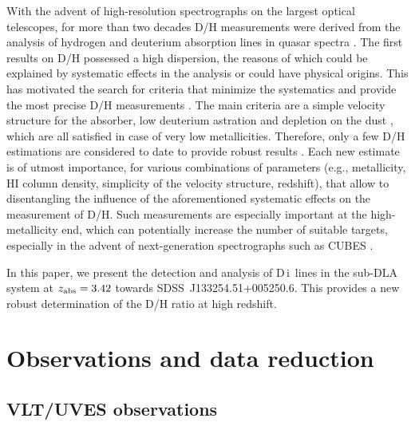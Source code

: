 \documentclass[fleqn,usenatbib]{mnras}
\newcommand{\SB}[1]{{\color{OrangeRed} SB:~ #1}}
\newcommand{\DI}[0]{D\,{\sc i}}
\newcommand{\ql}{SDSS~J133254.51+005250.6}
\begin{document}
With the advent of high-resolution spectrographs on the largest optical telescopes, for more than two decades D/H measurements were derived from the analysis of hydrogen and deuterium absorption lines in quasar spectra \citep{Tytler_1996, Noterdaeme_2012, Cooke_2014, Cooke_2018}. The first results on D/H possessed a high dispersion, the reasons of which could be explained by systematic effects in the analysis or could have physical origins. This has motivated the search for criteria that minimize the systematics and provide the most precise D/H measurements \citep{Cooke_2014}. The main criteria are a simple velocity structure for the absorber, low deuterium astration and depletion on the dust \citep{Cooke_2018}, which are all satisfied in case of very low metallicities. Therefore, only a few D/H estimations are considered to date to provide robust results \citep{Cooke_2018}. %
Each new estimate is of utmost importance, for various combinations of parameters (e.g., metallicity, HI column density, simplicity of the velocity structure, redshift), that allow to disentangling the influence of the aforementioned systematic effects on the measurement of D/H. Such measurements are especially important at the high-metallicity end, which can potentially increase the number of suitable targets, especially in the advent of next-generation spectrographs such as CUBES \citep{Cubes2022}.

In this paper, we present the detection and analysis of \DI\ lines in the sub-DLA system at $z_{\rm abs}=3.42$ towards \ql. This provides a new robust determination of the D/H ratio at high redshift.

\section{Observations and data reduction}
\label{sec:obs}

\subsection{VLT/UVES observations}
\end{document}
